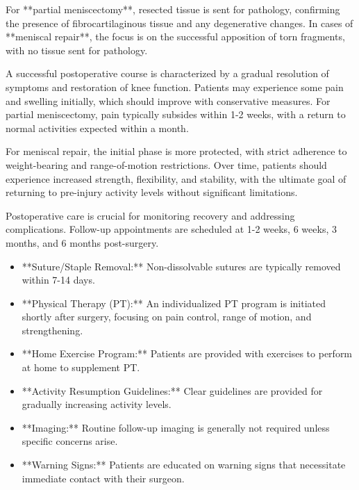 For **partial meniscectomy**, resected tissue is sent for pathology, confirming the presence of fibrocartilaginous tissue and any degenerative changes. In cases of **meniscal repair**, the focus is on the successful apposition of torn fragments, with no tissue sent for pathology.

A successful postoperative course is characterized by a gradual resolution of symptoms and restoration of knee function. Patients may experience some pain and swelling initially, which should improve with conservative measures. For partial meniscectomy, pain typically subsides within 1-2 weeks, with a return to normal activities expected within a month.

For meniscal repair, the initial phase is more protected, with strict adherence to weight-bearing and range-of-motion restrictions. Over time, patients should experience increased strength, flexibility, and stability, with the ultimate goal of returning to pre-injury activity levels without significant limitations.

Postoperative care is crucial for monitoring recovery and addressing complications. Follow-up appointments are scheduled at 1-2 weeks, 6 weeks, 3 months, and 6 months post-surgery.

\begin{itemize}
  \item **Suture/Staple Removal:** Non-dissolvable sutures are typically removed within 7-14 days.
  
  \item **Physical Therapy (PT):** An individualized PT program is initiated shortly after surgery, focusing on pain control, range of motion, and strengthening.

  \item **Home Exercise Program:** Patients are provided with exercises to perform at home to supplement PT.

  \item **Activity Resumption Guidelines:** Clear guidelines are provided for gradually increasing activity levels.

  \item **Imaging:** Routine follow-up imaging is generally not required unless specific concerns arise.

  \item **Warning Signs:** Patients are educated on warning signs that necessitate immediate contact with their surgeon.
\end{itemize}

